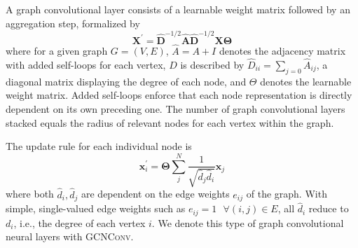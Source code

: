 \documentclass{bioinfo}
\begin{document}
A graph convolutional layer \citet{GCNConv} consists of a learnable
weight matrix followed by an aggregation step, formalized by
\begin{equation}
	\mathbf{X}^{\prime} = \mathbf{\hat{D}}^{-1/2} \mathbf{\hat{A}}
	\mathbf{\hat{D}}^{-1/2} \mathbf{X} \mathbf{\Theta}
\end{equation}
where for a given graph $G=(V,E)$, $\hat{A} = A + I$ denotes the
adjacency matrix with added self-loops for each vertex, $D$ is
described by $\hat{D}_{ii} = \sum_{j=0} \hat{A}_{ij}$, a diagonal
matrix displaying the degree of each node, and $\Theta$ denotes the
learnable weight matrix. Added self-loops enforce that each node
representation is directly dependent on its own preceding one. The
number of graph convolutional layers stacked equals the radius of
relevant nodes for each vertex within the graph.

The update rule for each individual node is
\begin{equation}
	\mathbf{x}^{\prime}_i = \mathbf{\Theta} \sum^{N}_{j}
	\frac{1}{\sqrt{\hat{d}_j \hat{d}_i}} \mathbf{x}_j
\end{equation}
where both $\hat{d}_i, \hat{d}_j$ are dependent on the edge weights
$e_{ij}$ of the graph. With simple, single-valued edge weights such as
$e_{ij}=1 \text{ }\forall (i,j)\in E$, all $\hat{d}_i$ reduce to
$d_i$, i.e., the degree of each vertex $i$. We denote this type of
graph convolutional neural layers with \textsc{GCNConv}.
\end{document}
